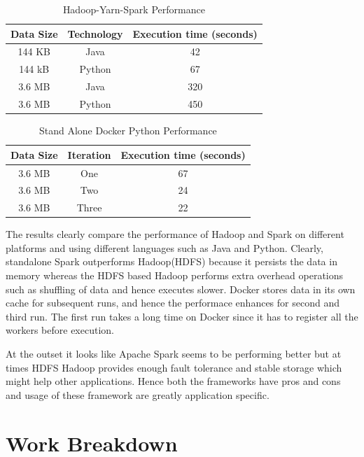 \begin{table}[hbt]
\centering
\caption{Hadoop-Yarn-Spark Performance}\label{t:results-table2}
    \begin{tabular}{ | c | c | c |}
    \hline
    Data Size & Technology & Execution time (seconds) \\ \hline
    144 KB & Java & 42   \\ \hline
    144 kB & Python & 67 \\ \hline
    3.6 MB & Java &  320  \\ \hline
    3.6 MB & Python & 450 \\
    \hline
    \end{tabular} 
\end{table}


\begin{table}[hbt]
\centering
\caption{Stand Alone Docker Python Performance}\label{t:results-table3}
    \begin{tabular}{ | c | c | c |}
    \hline
    Data Size & Iteration & Execution time (seconds) \\ \hline
    3.6 MB & One & 67  \\ \hline
    3.6 MB & Two & 24 \\ \hline
    3.6 MB & Three & 22 \\ \hline
    \end{tabular}
\end{table}


The results clearly compare the performance of Hadoop and Spark 
on different platforms and using different languages such as Java and Python. 
Clearly, standalone Spark outperforms Hadoop(HDFS) because it persists 
 the data in memory whereas the HDFS based Hadoop performs extra overhead 
 operations such as shuffling of data and hence executes slower. 
 Docker stores data in its own cache for subsequent runs, and hence the 
 performace enhances for second and third run. The first run takes a long time 
 on Docker since it has to register all the workers before execution.

 At the outset it looks like Apache Spark seems to be performing better but at 
 times HDFS Hadoop provides enough fault tolerance and stable storage which 
 might help other applications. Hence both the frameworks have pros and cons and
 usage of these framework are greatly application specific. 


% 


\section{Work Breakdown}


